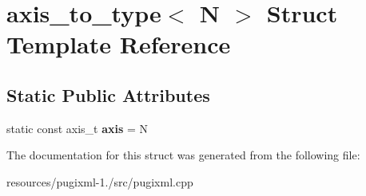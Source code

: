 \hypertarget{structaxis__to__type}{\section{axis\+\_\+to\+\_\+type$<$ N $>$ Struct Template Reference}
\label{structaxis__to__type}
}
\subsection*{Static Public Attributes}
\begin{DoxyCompactItemize}
\item 
\hypertarget{structaxis__to__type_ac9d75681918ad98c980db0f49b570b50}{static const axis\+\_\+t {\bfseries axis} = N}\label{structaxis__to__type_ac9d75681918ad98c980db0f49b570b50}

\end{DoxyCompactItemize}


The documentation for this struct was generated from the following file\+:\begin{DoxyCompactItemize}
\item 
resources/pugixml-\/1./src/pugixml.\+cpp\end{DoxyCompactItemize}
